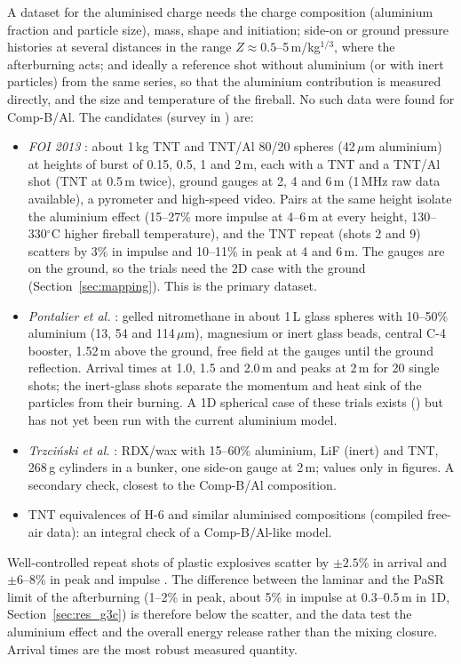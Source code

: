 \documentclass{article}
\begin{document}
A dataset for the aluminised charge needs the charge composition (aluminium fraction and particle size), mass, shape and initiation; side-on or ground pressure histories at several distances in the range $Z \approx 0.5$--5\,m/kg$^{1/3}$, where the afterburning acts; and ideally a reference shot without aluminium (or with inert particles) from the same series, so that the aluminium contribution is measured directly, and the size and temperature of the fireball. No such data were found for Comp-B/Al. The candidates (survey in ) are:
\begin{itemize}
    \item \emph{FOI 2013} \cite{fedina2014,fedina2017}: about 1\,kg TNT and TNT/Al 80/20 spheres (42\,$\mu$m aluminium) at heights of burst of 0.15, 0.5, 1 and 2\,m, each with a TNT and a TNT/Al shot (TNT at 0.5\,m twice), ground gauges at 2, 4 and 6\,m (1\,MHz raw data available), a pyrometer and high-speed video. Pairs at the same height isolate the aluminium effect (15--27\% more impulse at 4--6\,m at every height, 130--330$^\circ$C higher fireball temperature), and the TNT repeat (shots 2 and 9) scatters by 3\% in impulse and 10--11\% in peak at 4 and 6\,m. The gauges are on the ground, so the trials need the 2D case with the ground (Section~\ref{sec:mapping}). This is the primary dataset.
    \item \emph{Pontalier et al.} \cite{pontalier2021}: gelled nitromethane in about 1\,L glass spheres with 10--50\% aluminium (13, 54 and 114\,$\mu$m), magnesium or inert glass beads, central C-4 booster, 1.52\,m above the ground, free field at the gauges until the ground reflection. Arrival times at 1.0, 1.5 and 2.0\,m and peaks at 2\,m for 20 single shots; the inert-glass shots separate the momentum and heat sink of the particles from their burning. A 1D spherical case of these trials exists () but has not yet been run with the current aluminium model.
    \item \emph{Trzci\'nski et al.} \cite{trzcinski2007}: RDX/wax with 15--60\% aluminium, LiF (inert) and TNT, 268\,g cylinders in a bunker, one side-on gauge at 2\,m; values only in figures. A secondary check, closest to the Comp-B/Al composition.
    \item TNT equivalences of H-6 and similar aluminised compositions (compiled free-air data): an integral check of a Comp-B/Al-like model.
\end{itemize}
Well-controlled repeat shots of plastic explosives scatter by $\pm2.5$\% in arrival and $\pm6$--8\% in peak and impulse \cite{farrimond2024}. The difference between the laminar and the PaSR limit of the afterburning (1--2\% in peak, about 5\% in impulse at 0.3--0.5\,m in 1D, Section~\ref{sec:res_g3c}) is therefore below the scatter, and the data test the aluminium effect and the overall energy release rather than the mixing closure. Arrival times are the most robust measured quantity.
\end{document}
